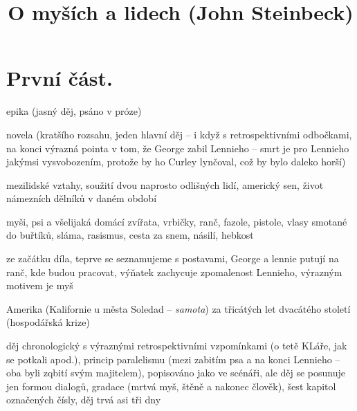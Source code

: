 \documentclass{article}
\title{\vspace{-2cm}O myších a lidech (John Steinbeck)\vspace{-2cm}}
\date{}
\author{}
\begin{document}
\maketitle
\section{První část.}
\begin{description}
    \setlength\itemsep{0.15em}
    \item[druh:] epika (jasný děj, psáno v próze)
    \item[žánr:] novela (kratšího rozsahu, jeden hlavní děj -- i když s retrospektivními odbočkami, na konci výrazná pointa v tom, že George zabil Lennieho -- smrt je pro Lennieho jakýmsi vysvobozením, protože by ho Curley lynčoval, což by bylo daleko horší)
    \item[téma:] mezilidské vztahy, soužití dvou naprosto odlišných lidí, americký sen, život námezních dělníků v daném období
    \item[motivy:] myši, psi a všelijaká domácí zvířata, vrbičky, ranč, fazole, pistole, vlasy smotané do buřtíků, sláma, rasismus, cesta za snem, násilí, hebkost
    \item[zařazení výňatku do kontextu díla:] ze začátku díla, teprve se seznamujeme s postavami, George a lennie putují na ranč, kde budou pracovat, výňatek zachycuje zpomalenost Lennieho, výrazným motivem je myš
    \item[časoprostor:] Amerika (Kalifornie u města Soledad -- \textit{samota}) za třicátých let dvacátého století (hospodářská krize)
    \item[kompoziční výstavba:] děj chronologický s výraznými retrospektivními vzpomínkami (o tetě KLáře, jak se potkali apod.), princip paralelismu (mezi zabitím psa a na konci Lennieho -- oba byli zqbití svým majitelem), popisováno jako ve scénáři, ale děj se posunuje jen formou dialogů, gradace (mrtvá myš, štěně a nakonec člověk), šest kapitol označených čísly, děj trvá asi tři dny
\end{description}
\end{document}
